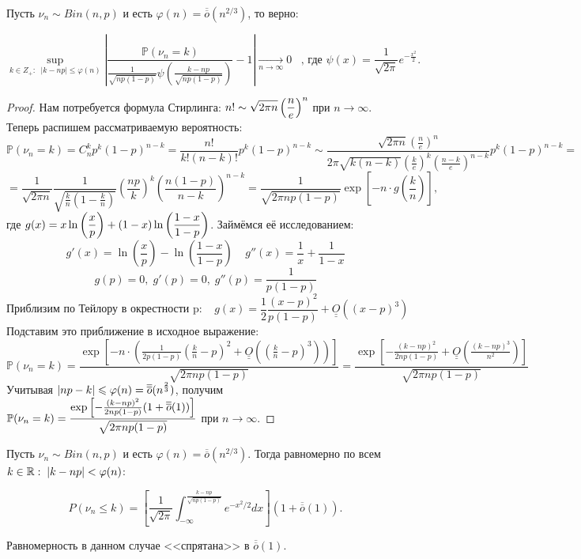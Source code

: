 \begin{theorem}
Пусть \( \nu_n \sim Bin(n, p)\) и есть \(\varphi(n) = \overline{\overline{o}}(n^{2/3})\), то верно:

\[\sup_{k\in Z_+:\;\; |k-np|\leqslant \varphi(n)}\left| \frac{\mathbb{P}(\nu_n=k)}{\frac{1}{\sqrt{np(1-p)}} \psi\left(\frac{k-np}{\sqrt{np(1-p)}}\right) } - 1 \right| \xrightarrow[n\to \infty]{} 0 \;\;\;
\text{, где }
\psi(x)=\frac{1}{\sqrt{2 \pi}}e^{-\frac{x^2}{2}}.\]
\end{theorem}
\begin{proof}
Нам потребуется формула Стирлинга: \(\mathlarger{n! \sim \sqrt{2 \pi n} \left( \frac{n}{e} \right)^n}\) при \(n\! \rightarrow\! \infty\). Теперь распишем рассматриваемую вероятность:
\[\mathbb{P}(\nu_n = k) = C_n^k p^k (1-p)^{n-k} = \frac{n!}{k!(n-k)!} p^k (1-p)^{n-k} \sim \frac{\sqrt{2 \pi n} \left( \frac{n}{e} \right)^n}{2 \pi \sqrt{k(n-k)}\left( \frac{k}{e}\right)^k \left( \frac{n-k}{e} \right)^{n-k}}p^k (1-p)^{n-k} =\]
\[= \frac{1}{\sqrt{2 \pi n}} \frac{1}{\sqrt{\frac{k}{n}(1 - \frac{k}{n})}} \left( \frac{np}{k} \right)^k \left( \frac{n (1-p)}{n-k} \right)^{n-k} = \frac{1}{\sqrt{2 \pi n p(1-p)}} \exp \left[-n \cdot g \left( \frac{k}{n} \right) \right],\]
где \(\mathlarger{g(x) = x \ln \left( \frac{x}{p} \right) + (1-x) \ln \left( \frac{1-x}{1-p} \right)}\). Займёмся её исследованием:
\[g'(x) = \ln \left( \frac{x}{p} \right) - \ln \left( \frac{1-x}{1-p} \right) \;\;\;\; g''(x) = \frac{1}{x} + \frac{1}{1-x}\]
\[g(p) = 0, \; g'(p)=0,\; g''(p)=\frac{1}{p(1-p)}\]
\[\text{Приблизим по Тейлору в окрестности p:} \;\;\;\; g(x) = \frac{1}{2}\frac{(x-p)^2}{p(1-p)} + \underline{\underline{O}}((x-p)^3)\]
Подставим это приближение в исходное выражение:
\[\mathbb{P} (\nu_n = k) = \frac{\exp \left[ -n \cdot \left( \frac{1}{2p(1-p)} \left( \frac{k}{n} - p \right)^2 + \underline{\underline{O}}\left( (\frac{k}{n} - p)^3 \right) \right)\right]}{\sqrt{2 \pi n p (1-p)}} = \frac{\exp \left[ -\frac{(k-np)^2}{2np(1-p)} + \underline{\underline{O}} \left( \frac{(k - np)^3}{n^2} \right) \right]}{\sqrt{2 \pi n p (1-p)}}\]
Учитывая \(\mathlarger{|np-k| \leqslant \varphi(n) = \overline{\overline{o}}(n^{\frac{2}{3}})}\), получим \(\mathlarger{ \mathbb{P}(\nu_n = k) = \frac{\exp \left[ -\frac{(k-np)^2}{2np(1-p)}(1 + \overline{\overline{o}}(1)) \right]}{\sqrt{2 \pi n p (1-p)}} } \) при \( n \rightarrow \infty \).
\end{proof}

\begin{theorem}
Пусть \( \nu_n \sim Bin(n, p)\) и есть \(\varphi(n) = \overline{\overline{o}}(n^{2/3})\). Тогда равномерно по всем $k \in \mathbb{R}:\;|k - np| < \varphi(n)$:

\[P(\nu_n \leqslant k) = \left[\frac{1}{\sqrt{2\pi}} \int_{-\infty}^{\frac{k - np}{\sqrt{np(1-p)}}} e^{-x^2 / 2}dx \right](1 + \overline{\overline{o}}(1)).\]

Равномерность в данном случае <<спрятана>> в $\overline{\overline{o}}(1)$.
\end{theorem}


